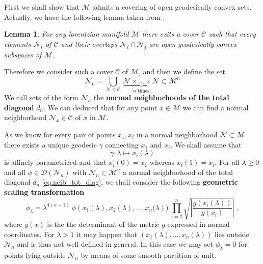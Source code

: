 \documentclass[11pt]{book}
\newcommand{\abs}[1]{\left|#1\right|}
\newcommand{\Ccal}{\mathcal{C}}
\newcommand{\Dcal}{\mathcal{D}}
\newcommand{\Mcal}{\mathcal{M}}
\newcommand{\Ncal}{\mathcal{N}}
\theoremstyle{break}
\newtheorem{lemma}{Lemma}[chapter]
\begin{document}
First we shall show that $\Mcal$ admits a covering of open geodesically convex sets. Actually, we have the following lemma taken from \cite{ONEIL_1983}.


\begin{lemma}
For any lorentzian manifold $\Mcal$ there exits a cover $\Ccal$ such that every elements $\Ncal_i$ of $\Ccal$ and their overlaps $\Ncal_i \cap \Ncal_j$ are open geodesically convex subspaces of $\Mcal$.
\end{lemma}


Therefore we consider such a cover $\Ccal$ of $\Mcal$, and then we define the set
%
\begin{equation}
\Ncal_{n} = \bigcup_{\Ncal\in\Ccal} \ \underbrace{\Ncal \times \dots \times \Ncal}_{n \mbox{ times}} \subset \Mcal^n 
\label{eq:neib_tot_diag}
\end{equation}
%
We call sets of the form $\Ncal_n$ the \textbf{normal neighborhoods of the total diagonal} $d_n$. We can deduced that for any point $x \in \Mcal$ we can find a normal neighborhood $\Ncal_x \in \Ccal$ of $x$ in $\Mcal$. 


As we know for every pair of points $x_1,x_i$ in a normal neighborhood $\Ncal \subset \Mcal$ there exists a unique geodesic $\gamma$ connecting $x_1$ and $x_i$. We shall assume that
%
\begin{equation*}
\gamma : \lambda \mapsto x_i(\lambda) 
\end{equation*}
%
is affinely parametrized and that $x_i(0) =x_1$ whereas $x_i(1) = x_i$. For all $\lambda \geq 0$ and all $\phi \in \Dcal(\Ncal_{n})$ with $\Ncal_n \subset \Mcal^n$ a normal neighborhood of the total diagonal $d_n$ \eqref{eq:neib_tot_diag}, we shall consider the following \textbf{geometric scaling transformation} 
%
\begin{equation}
\phi_\lambda = \lambda^{4(n-1)} \ \phi\left(x_1(\lambda ),x_2(\lambda ),\dots,x_n(\lambda\right)) \ \prod_{i=2}^n \sqrt{\abs{\frac{g(x_i(\lambda ))}{g(x_i)}}} \ ,
\label{eq:geo_scaling_transfo}
\end{equation}
%
where $g(x)$ is the the determinant of the metric $g$ expressed in normal coordinates. For $\lambda > 1$ it may happen that $(x_1(\lambda),\dots, x_n(\lambda))$ lies outside $\Ncal_n$ and is thus not well defined in general. In this case we may set $\phi_\lambda = 0$  for points lying outside $\Ncal_n$ by means of some smooth partition of unit.
\end{document}
